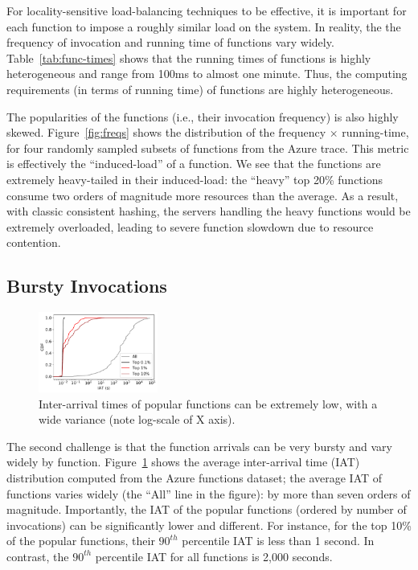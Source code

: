 For locality-sensitive load-balancing techniques to be effective, it is important for each function to impose a roughly similar load on the system. 
In reality, the the frequency of invocation and running time of functions vary widely. 
Table~\ref{tab:func-times} shows that the running times of functions is highly heterogeneous and range from 100ms to almost one minute.
Thus, the computing requirements (in terms of running time) of functions are highly heterogeneous. 

The popularities of the functions (i.e., their invocation frequency) is also highly skewed. 
Figure~\ref{fig:freqs} shows the distribution of the frequency $\times$ running-time, for four randomly sampled subsets of functions from the Azure trace. 
This metric is effectively the ``induced-load'' of a function. 
We see that the functions are extremely heavy-tailed in their induced-load: the ``heavy'' top 20\% functions consume two orders of magnitude more resources than the average. 
As a result, with classic consistent hashing, the servers handling the heavy functions would be extremely overloaded, leading to severe function slowdown due to resource contention. 

\subsection{Bursty Invocations}


\begin{figure}
  \centering 
  \includegraphics[width=0.35\textwidth]{../figs/iats-all.pdf}
  \caption{Inter-arrival times of popular functions can be extremely low, with a wide variance (note log-scale of X axis).}
  \label{fig:iats}
\end{figure}

The second challenge is that the function arrivals can be very bursty and vary widely by function. 
Figure~\ref{fig:iats} shows the average inter-arrival time (IAT) distribution computed from the Azure functions dataset;
the average IAT of functions varies widely (the ``All'' line in the figure): by more than seven orders of magnitude.
Importantly, the IAT of the popular functions (ordered by number of invocations) can be significantly lower and different. For instance, for the top 10\% of the popular functions, their $90^{th}$ percentile IAT is less than 1 second. In contrast, the $90^{th}$ percentile IAT for all functions is 2,000 seconds.
%

